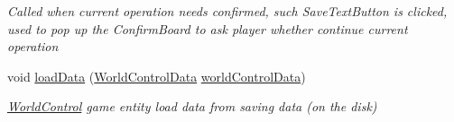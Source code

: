 \begin{DoxyCompactItemize}
\begin{DoxyCompactList}\small\item\em Called when current operation needs confirmed, such Save\+Text\+Button is clicked, used to pop up the Confirm\+Board to ask player whether continue current operation \end{DoxyCompactList}\item 
void \hyperlink{classdoki_unity_1_1_world_control_af8300d17c658b78da34f456bedc0a540}{load\+Data} (\hyperlink{classdoki_unity_1_1_world_control_data}{World\+Control\+Data} \hyperlink{classdoki_unity_1_1_world_control_ae4d88d77b7d39fb0dda5ffa4dbf2e2af}{world\+Control\+Data})
\begin{DoxyCompactList}\small\item\em \hyperlink{classdoki_unity_1_1_world_control}{World\+Control} game entity load data from saving data (on the disk) \end{DoxyCompactList}\end{DoxyCompactItemize}
